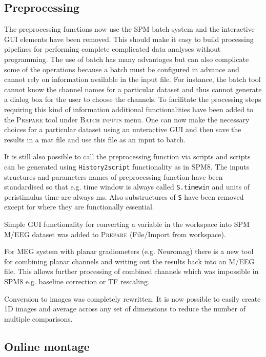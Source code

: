 \documentclass[a4paper,titlepage,openany]{article}
\begin{document}
\begin{multicols}{2}
\subsection{Preprocessing}

The preprocessing functions now use the SPM batch system and the interactive GUI elements have been removed. This should make it easy to build processing pipelines for performing complete complicated data analyses without programming. The use of batch has many advantages but can also complicate some of the operations because a batch must be configured in advance and cannot rely on information available in the input file. For instance, the batch tool cannot know the channel names for a particular dataset and thus cannot generate a dialog box for the user to choose the channels. To facilitate the processing steps requiring this kind of information additional functionalities have been added to the \textsc{Prepare} tool under \textsc{Batch inputs} menu. One can now make the necessary choices for a particular dataset using an unteractive GUI and then save the results in a mat file and use this file as an input to batch.

It is still also possible to call the preprocessing function via scripts and scripts can be generated using \texttt{History2script} functionality as in SPM8. The inputs structures and parameters names of preprocessing function have been standardised so that e.g. time window is always called \texttt{S.timewin} and units of peristimulus time are always ms. Also substructures of \texttt{S} have been removed except for where they are functionally essential.

Simple GUI functionality for converting a variable in the workspace into SPM M/EEG dataset was added to \textsc{Prepare} (File/Import from workspace).

For MEG system with planar gradiometers (e.g. Neuromag) there is a new tool for combining planar channels and writing out the results back into an M/EEG file. This allows further processing of combined channels which was impossible in SPM8 e.g. baseline correction or TF rescaling.

Conversion to images was completely rewritten. It is now possible to easily create 1D images and average across any set of dimensions to reduce the number of multiple comparisons.

\subsection{Online montage}


\end{multicols}
\end{document}

